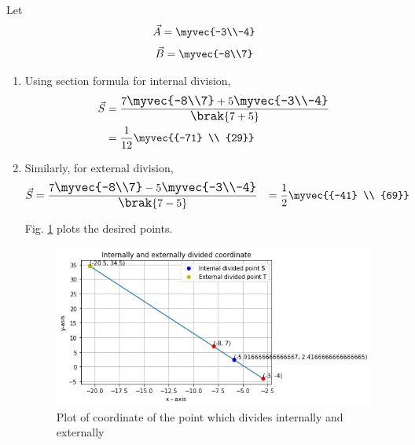 
Let
\begin{align}
    \Vec{A}=\myvec{-3\\-4}
\end{align}
\begin{align}
    \Vec{B}=\myvec{-8\\7}
\end{align}
\begin{enumerate}
\item Using section formula for internal division, 
\begin{align}
\vec{S}&=\large{\frac{7\myvec{-8\\7}+5\myvec{-3\\-4}}{\brak{7+5}}}   
\\
&=\frac{1}{12}\myvec{{-71} \\ {29}}
\end{align}
\item Similarly, for external division, 
\begin{align}
\vec{S}&=\large{\frac{7\myvec{-8\\7}-5\myvec{-3\\-4}}{\brak{7-5}}}   
&=\frac{1}{2} \myvec{{-41} \\ {69}}
\end{align}

Fig. \ref{1/18fig} plots the desired points.
\begin{figure}[!ht]
\centering
\includegraphics[width=\columnwidth]{solutions/1/18/Internal and external point.png}
\caption{ Plot of coordinate of the point which divides internally and externally }
\label{1/18fig}
\end{figure}
 \end{enumerate} 
